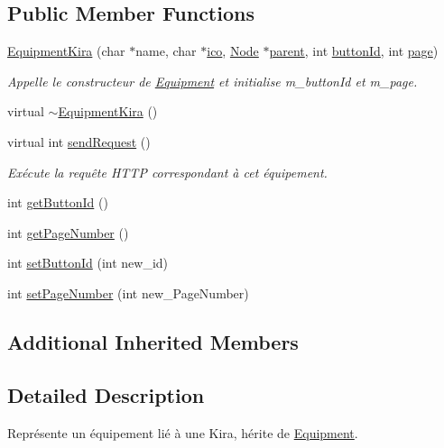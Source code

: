 \subsection*{Public Member Functions}
\begin{DoxyCompactItemize}
\item 
\hyperlink{class_e_p_1_1_equipment_kira_a7b96ccdab1a7d69e656c9602fce99213}{Equipment\+Kira} (char $\ast$name, char $\ast$\hyperlink{namespace_e_p_a9bb18717237cbb94269e26c77cc04b05}{ico}, \hyperlink{class_e_p_1_1_node}{Node} $\ast$\hyperlink{namespace_e_p_ae54856cdea91964313d781ec414f88fc}{parent}, int \hyperlink{namespace_e_p_af35e4c78a6ab0ddc628032ea5894199a}{button\+Id}, int \hyperlink{namespace_e_p_adb4f80317eaf1286f16eedd566da82ba}{page})
\begin{DoxyCompactList}\small\item\em Appelle le constructeur de \hyperlink{class_e_p_1_1_equipment}{Equipment} et initialise m\+\_\+button\+Id et m\+\_\+page. \end{DoxyCompactList}\item 
virtual \hyperlink{class_e_p_1_1_equipment_kira_a8c05775df3123050be8e676ce24ac8df}{$\sim$\+Equipment\+Kira} ()
\item 
virtual int \hyperlink{class_e_p_1_1_equipment_kira_ad59c93de1b98996ec273c5638cd7e47a}{send\+Request} ()
\begin{DoxyCompactList}\small\item\em Exécute la requête H\+T\+TP correspondant à cet équipement. \end{DoxyCompactList}\item 
int \hyperlink{class_e_p_1_1_equipment_kira_ae2ce7a10bf38a28b5c0c8f44420c3f10}{get\+Button\+Id} ()
\item 
int \hyperlink{class_e_p_1_1_equipment_kira_a689d07be3886b6b195e9c7bb3c20986d}{get\+Page\+Number} ()
\item 
int \hyperlink{class_e_p_1_1_equipment_kira_a1e695e63e1e736d1d107079a8277db2c}{set\+Button\+Id} (int new\+\_\+id)
\item 
int \hyperlink{class_e_p_1_1_equipment_kira_a788cf486ccf2652a40f4104f27478d74}{set\+Page\+Number} (int new\+\_\+\+Page\+Number)
\end{DoxyCompactItemize}
\subsection*{Additional Inherited Members}


\subsection{Detailed Description}
Représente un équipement lié à une Kira, hérite de \hyperlink{class_e_p_1_1_equipment}{Equipment}. 

